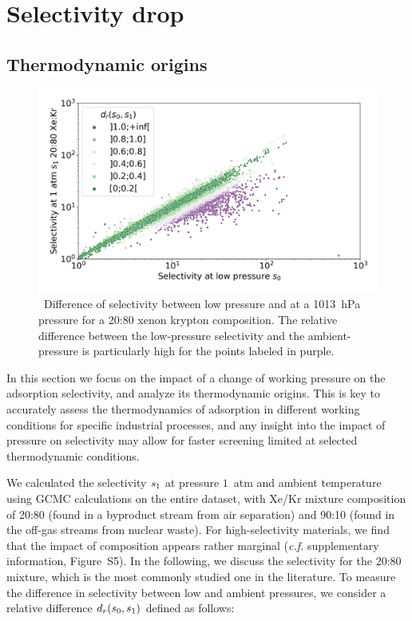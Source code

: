\documentclass[main.tex]{subfiles}
\begin{document}
\section{Selectivity drop}

\subsection{Thermodynamic origins}\label{section:pressure}

\begin{figure}[t]
  \centering
    \includegraphics[width=\linewidth]{figures/2-thermo/s_0_vs_s_2080_overview_log.jpg}
    \caption{\ Difference of selectivity between low pressure and at a \SI{1013}{\hecto\pascal} pressure for a 20:80 xenon krypton composition. The relative difference between the low-pressure selectivity and the ambient-pressure is particularly high for the points labeled in purple.}
    \label{fgr:overview}
  \end{figure}
  
  In this section we focus on the impact of a change of working pressure on the adsorption selectivity, and analyze its thermodynamic origins. This is key to accurately assess the thermodynamics of adsorption in different working conditions for specific industrial processes, and any insight into the impact of pressure on selectivity may allow for faster screening limited at selected thermodynamic conditions.
  
  We calculated the selectivity $s_{\text{1}}$ at pressure $1$~atm and ambient temperature using GCMC calculations on the entire dataset, with Xe/Kr mixture composition of 20:80 (found in a byproduct stream from air separation\cite{kerry2007industrial}) and 90:10 (found in the off-gas streams from nuclear waste\cite{auerbach2003handbook}). For high-selectivity materials, we find that the impact of composition appears rather marginal (\emph{c.f.} supplementary information, Figure~S5). In the following, we discuss the selectivity for the 20:80 mixture, which is the most commonly studied one in the literature. To measure the difference in selectivity between low and ambient pressures, we consider a relative difference $d_r(s_{\text{0}},s_{\text{1}})$ defined as follows:
  
\end{document}
